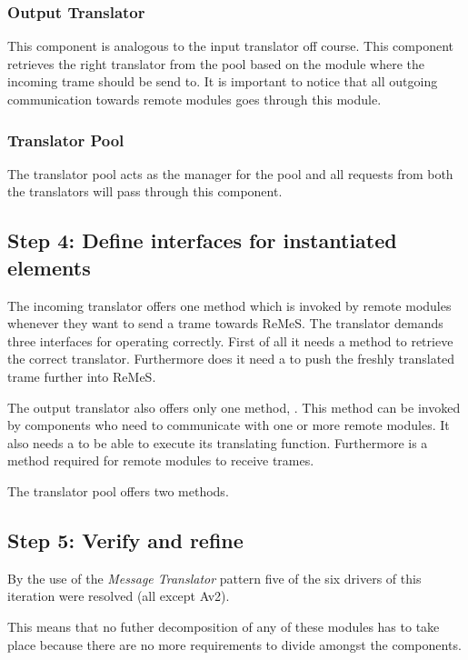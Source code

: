 
\subsubsection{Output Translator}

\npar This component is analogous to the input translator off course. This
component retrieves the right translator from the pool based on the module
where the incoming trame should be send to. It is important to notice that all
outgoing communication towards remote modules goes through this module.

\subsubsection{Translator Pool}

\npar The translator pool acts as the manager for the pool and all requests from
both the translators will pass through this component. 

\subsection{Step 4: Define interfaces for instantiated elements}
\label{add:it2/interfaces}

\npar The incoming translator offers one method 
which is invoked by remote modules whenever they want to send a trame towards
ReMeS. The translator demands three interfaces for operating correctly. First of
all it needs a  method to retrieve the correct
translator. Furthermore does it need a  to
push the freshly translated trame further into ReMeS. 


\npar The output translator also offers only one method, .
This method can be invoked by components who need to communicate with one or
more remote modules. It also needs a  to
be able to execute its translating function. Furthermore is a
 method required for remote modules to receive trames. 

\npar The translator pool offers two methods.


\subsection{Step 5: Verify and refine}
\label{add:it2/verification}

\npar By the use of the \emph{Message Translator} pattern five of the six
drivers of this iteration were resolved (all except Av2). 


\npar This means that no futher decomposition of any of these modules has to
take place because there are no more requirements to divide amongst the
components. 
